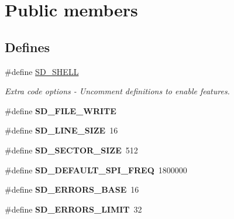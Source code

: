 \hypertarget{group__sd__public}{\section{\-Public members}
\label{group__sd__public}
}
\subsection*{\-Defines}
\begin{DoxyCompactItemize}
\item 
\#define \hyperlink{group__sd__public_ga453e7feb2ddf9256c6b5ab9399b12abc}{\-S\-D\-\_\-\-S\-H\-E\-L\-L}
\begin{DoxyCompactList}\small\item\em \-Extra code options -\/ \-Uncomment definitions to enable features. \end{DoxyCompactList}\item 
\hypertarget{group__sd__public_gaf5d27aba1c39917482f4b3d40349e73e}{\#define {\bfseries \-S\-D\-\_\-\-F\-I\-L\-E\-\_\-\-W\-R\-I\-T\-E}}\label{group__sd__public_gaf5d27aba1c39917482f4b3d40349e73e}

\item 
\hypertarget{group__sd__public_gaf212493d1701d0e23dd8a98c2e963a7b}{\#define {\bfseries \-S\-D\-\_\-\-L\-I\-N\-E\-\_\-\-S\-I\-Z\-E}~16}\label{group__sd__public_gaf212493d1701d0e23dd8a98c2e963a7b}

\item 
\hypertarget{group__sd__public_ga35d62ba285152f13c64ba9e11fe69e7c}{\#define {\bfseries \-S\-D\-\_\-\-S\-E\-C\-T\-O\-R\-\_\-\-S\-I\-Z\-E}~512}\label{group__sd__public_ga35d62ba285152f13c64ba9e11fe69e7c}

\item 
\hypertarget{group__sd__public_ga13c71cd2e72c08f268a266c9c6e7c52d}{\#define {\bfseries \-S\-D\-\_\-\-D\-E\-F\-A\-U\-L\-T\-\_\-\-S\-P\-I\-\_\-\-F\-R\-E\-Q}~1800000}\label{group__sd__public_ga13c71cd2e72c08f268a266c9c6e7c52d}

\item 
\hypertarget{group__sd__public_ga3cd0c771442b35775f55f3982c2dc873}{\#define {\bfseries \-S\-D\-\_\-\-E\-R\-R\-O\-R\-S\-\_\-\-B\-A\-S\-E}~16}\label{group__sd__public_ga3cd0c771442b35775f55f3982c2dc873}

\item 
\hypertarget{group__sd__public_ga62e655fb68f48dbab77aec76faef26ae}{\#define {\bfseries \-S\-D\-\_\-\-E\-R\-R\-O\-R\-S\-\_\-\-L\-I\-M\-I\-T}~32}\label{group__sd__public_ga62e655fb68f48dbab77aec76faef26ae}


\end{DoxyCompactItemize}
